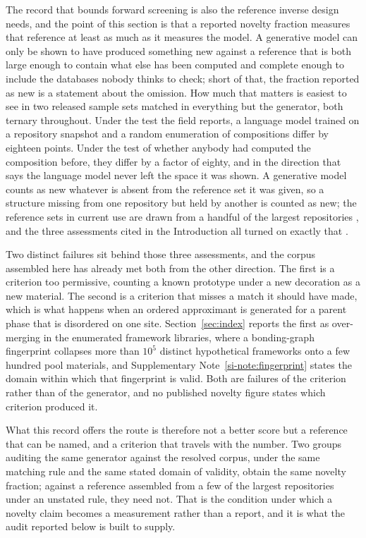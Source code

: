 The record that bounds forward screening is also the reference inverse design
needs, and the point of this section is that a reported novelty fraction measures
that reference at least as much as it measures the model. A generative model can
only be shown to have produced something new against a reference that is both
large enough to contain what else has been computed and complete enough to
include the databases nobody thinks to check; short of that, the fraction
reported as new is a statement about the omission. How much that matters is
easiest to see in two released sample sets matched in everything but the
generator, both ternary throughout. Under the test the field reports, a language
model trained on a repository snapshot and a random enumeration of compositions
differ by eighteen points. Under the test of whether anybody had computed the
composition before, they differ by a factor of eighty, and in the direction that
says the language model never left the space it was shown. A generative model
counts as new whatever is absent from the reference set it was given, so a
structure missing from one repository but held by another is counted as new; the
reference sets in current use are drawn from a handful of the largest
repositories \cite{ramlaoui2025lemat,betala2025lematgenbench}, and the three
assessments cited in the Introduction all turned on exactly that
\cite{cheetham2024artificial,juelsholt2026continued,szymanski2025baselines}.

Two distinct failures sit behind those three assessments, and the corpus
assembled here has already met both from the other direction. The first is a
criterion too permissive, counting a known prototype under a new decoration as a
new material. The second is a criterion that misses a match it should have made,
which is what happens when an ordered approximant is generated for a parent phase
that is disordered on one site. Section~\ref{sec:index} reports the first as
over-merging in the enumerated framework libraries, where a bonding-graph
fingerprint collapses more than $10^5$ distinct hypothetical frameworks onto a
few hundred pool materials, and Supplementary Note~\ref{si-note:fingerprint}
states the domain within which that fingerprint is valid. Both are failures of the criterion rather than of the generator, and no published
novelty figure states which criterion produced it.

What this record offers the route is therefore not a better score but a reference
that can be named, and a criterion that travels with the number. Two groups
auditing the same generator against the resolved corpus, under the same matching
rule and the same stated domain of validity, obtain the same novelty fraction;
against a reference assembled from a few of the largest repositories under an
unstated rule, they need not. That is the condition under which a novelty claim
becomes a measurement rather than a report, and it is what the audit reported
below is built to supply.

